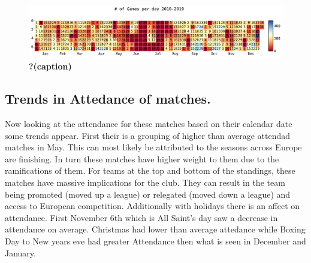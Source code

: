 \documentclass[
  letterpaper,
  DIV=11,
  numbers=noendperiod]{scrartcl}
\begin{document}
\begin{figure}[H]

{\centering \includegraphics{Blog_post_files/figure-pdf/fig-cal_count-output-1.pdf}

}

\caption{\label{fig-cal_count}\textbf{?(caption)}}

\end{figure}

\hypertarget{trends-in-attedance-of-matches.}{%
\subsection{Trends in Attedance of
matches.}\label{trends-in-attedance-of-matches.}}

Now looking at the attendance for these matches based on their calendar
date some trends appear. First their is a grouping of higher than
average attendad matches in May. This can most likely be attributed to
the seasons across Europe are finishing. In turn these matches have
higher weight to them due to the ramifications of them. For teams at the
top and bottom of the standings, these matches have massive implications
for the club. They can result in the team being promoted (moved up a
league) or relegated (moved down a league) and access to European
competition. Additionally with holidays there is an affect on
attendance. First November 6th which is All Saint's day saw a decrease
in attendance on average. Christmas had lower than average attedance
while Boxing Day to New years eve had greater Attendance then what is
seen in December and January.
\end{document}
